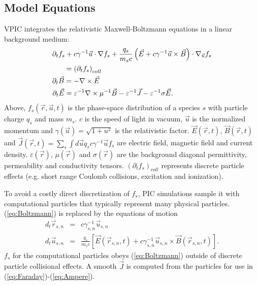 \documentclass[journal,twoside]{IEEEtran}
\newcommand{\eps}{\varepsilon}
\newcommand{\vecr}{\vec{r}}
\newcommand{\vecu}{\vec{u}}
\newcommand{\vecJ}{\vec{J}}
\newcommand{\vecE}{\vec{E}}
\newcommand{\vecB}{\vec{B}}
\newcommand{\Deriv}[2]{d_{#2}#1}
\newcommand{\PDeriv}[2]{\partial_{#2}#1}
\newcommand{\DotP}[2]{#1 \cdot #2}
\newcommand{\CrossP}[2]{#1 \times #2}
\newcommand{\Grad}[1]{\nabla #1}
\newcommand{\Curl}[1]{\nabla \times #1}
\newcommand{\Gradu}[1]{\nabla_{\vecu} #1}
\newcommand{\eq}[1]{(\ref{eq:#1})}
\begin{document}
\subsection{Model Equations}

VPIC integrates the relativistic Maxwell-Boltzmann equations in a
linear background medium:
\begin{eqnarray}
\PDeriv{f_s}{t} + 
\DotP{c\gamma^{-1}\vecu}{\Grad{f_s}} +
\DotP{\frac{q_s}{m_s c}\left(\vecE+\CrossP{c\gamma^{-1}\vecu}{\vecB}\right)}
{\Gradu{f_s}}\nonumber&\\
= \left(\PDeriv{f_s}{t}\right)_{coll}\label{eq:Boltzmann}
\hspace{2.14in}&\\
\PDeriv{\vecB}{t} = -\Curl{\vecE} \label{eq:Faraday}
\hspace{2.18in}&\\
\PDeriv{\vecE}{t} =
\eps^{-1}\Curl{\mu^{-1}\vecB} - \eps^{-1}\vecJ - \eps^{-1}\sigma\vecE.
\label{eq:Ampere}
\hspace{0.75in}&
\end{eqnarray}
Above, $f_s\left(\vecr,\vecu,t\right)$ is the phase-space distribution
of a species $s$ with particle charge $q_s$ and mass $m_s$.  $c$ is
the speed of light in vacuum, $\vecu$ is the normalized momentum and
$\gamma\left(\vecu\right) = \sqrt{1 + u^2}$ is the relativistic
factor.  $\vecE\left(\vecr,t\right)$, $\vecB\left(\vecr,t\right)$ and
$\vecJ\left(\vecr,t\right) = \sum_s \int d\vecu q_s c\gamma^{-1}\vecu
f_s$ are electric field, magnetic field and current density.
$\eps\left(\vecr\right)$, $\mu\left(\vecr\right)$ and
$\sigma\left(\vecr\right)$ are the background diagonal permittivity,
permeability and conductivity tensors.
$\left(\PDeriv{f_s}{t}\right)_{coll}$ represents discrete particle
effects (e.g. short range Coulomb collisions, excitation and
ionization).

To avoid a costly direct discretization of $f_s$, PIC simulations
sample it with computational particles that typically represent many
physical particles.  \eq{Boltzmann} is replaced by the equations of
motion
\begin{eqnarray}
\Deriv{\vecr_{s,n}}{t} &=& c \gamma_{s,n}^{-1} \vecu_{s,n} \label{eq:Position}\\
\Deriv{\vecu_{s,n}}{t} &=& \frac{q_s}{m_s c} \left[
\vecE\left(\vecr_{s,n},t\right) +
\CrossP{c\gamma_{s,n}^{-1}\vecu_{s,n}}{\vecB\left(\vecr_{s,n},t\right)}
\right] \label{eq:Momentum}
.
\end{eqnarray}
$f_s$ for the computational particles obeys \eq{Boltzmann} outside of
discrete particle collisional effects.  A smooth $\vecJ$ is computed
from the particles for use in \eq{Faraday}-\eq{Ampere}.
\end{document}
